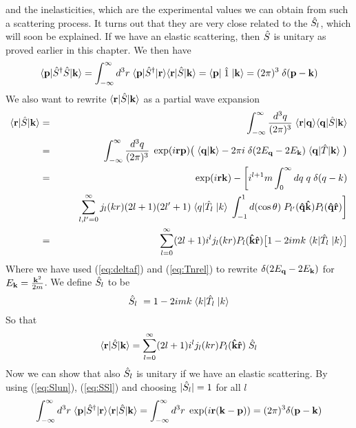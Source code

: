 and the inelasticities, which are the experimental values we can obtain from such a scattering process.
It turns out that they are very close related to the $\hat{S}_l$, which will soon be explained.
If we have an elastic scattering, then $\hat{S}$ is unitary as proved earlier in this chapter.
We then have
%
\begin{equation}\label{eq:Slun}
\braketm{{\bf p}}{\op{S}^\dagger \op{S}}{{\bf k}}=\int^{\infty}_{-\infty} d^3 { r}\;
\braketm{{\bf p}}{\op{S}^\dagger }{{\bf r}}\braketm{{\bf r}}{\op{S} }{{\bf k}} 
=\braketm{{\bf p}} {\;\op{1}\;}{{\bf k}}=(2\pi)^3\;\delta ({\bf p}-{\bf k})
\end{equation}
%
We also want to rewrite $\langle{\bf r}|\hat{S} |{\bf k}\rangle$ as a partial
wave expansion
%
\begin{eqnarray}\label{eq:Slutledning}  
\braketm{{\bf r}}{\op{S} }{{\bf k}} 
&=&
\int^{\infty}_{-\infty} \frac{d^3 { q}}{(2\pi)^3}\;\braket{{\bf r}}{{\bf q}}
\braketm{{\bf q}}{\op{S} }{{\bf k}}\nonumber\\
&=&
\int^{\infty}_{-\infty} \frac{d^3 { q}}{(2\pi)^3}\; \exp(i{\bf rp})\big(\;
\braket{{\bf q}}{{\bf k}} -2\pi i\; \delta (2E_{\bf q}-2E_{\bf k})\;\braketm{{\bf q}}{\op{T}}{\bf{k}}\;\big)\nonumber\\  
&=&
\exp(i{\bf rk})-\bigg[ i^{l+1}m\int^{\infty}_{0}dq\;q\;\delta (q-k)\nonumber\\
&&\qquad 
\sum^{\infty}_{l,l'=0}j_{l}(kr)(2l+1)(2l'+1)\;\bra{q}\op{T}_{l}\;\ket{{ k}}\;\int^{1}_{-1}d(\cos\theta)\; P_{l'}
({\bf \op{q}\op{k}})P_{l}({\bf \op{q}\op{r}})\bigg] \nonumber\\
&=& 
\sum^{\infty}_{l=0} (2l+1) i^{l} j_{l}(kr)P_l({\bf \op{k}\op{r}})\big[1-2imk\;\bra{k}\op{T}_{l}\;\ket{{ k}} \big]
\end{eqnarray}
%
Where we have used (\ref{eq:deltaf}) and (\ref{eq:Tnrel}) to rewrite $\delta (2E_{\bf q}-2E_{\bf k})$ for 
$E_{\bf k}=\frac{{\bf k}^2}{2m}$. We define ${\hat{S} }_l$ to be
%
\begin{equation}\label{eq:Sl} 
\op{S}_{l}\ =1-2imk\;\bra{k}\op{T}_{l}\;\ket{{ k}}
\end{equation}
%
So that
%
\begin{equation}\label{eq:SSl}
\braketm{{\bf r}}{\op{S} }{{\bf k}} =\sum^{\infty}_{l=0} (2l+1) i^{l} j_{l}(kr)P_l({\bf \op{k}\op{r}})\;\op{S}_{l}
\end{equation}
%
Now we can show that also ${\hat{S} }_l$ is unitary if we have an elastic scattering. By
using (\ref{eq:Slun}), (\ref{eq:SSl}) and choosing $|\hat{S}_{l}|=1$ for all $l$
%
\begin{equation}\label{eq:SSlun}
\int^{\infty}_{-\infty} d^3 { r}\;
\braketm{{\bf p}}{\op{S}^\dagger }{{\bf r}}\braketm{{\bf r}}{\op{S} }{{\bf k}}
=
\int^{\infty}_{-\infty} d^3 { r}\; \exp(i{\bf r(k-p)})=(2\pi)^3\delta ({\bf p}-{\bf k})
\end{equation}
